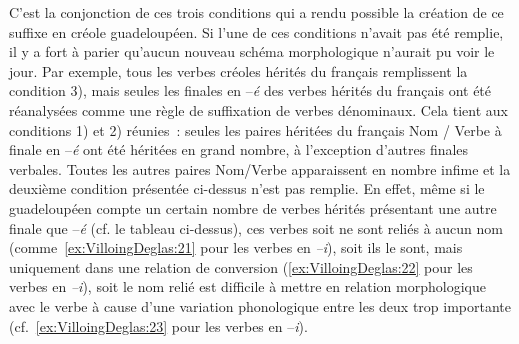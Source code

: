 \documentclass[output=paper]{langsci/langscibook}
\begin{document}
C'est la conjonction de ces trois conditions qui a rendu possible la
création de ce suffixe en créole guadeloupéen. Si l'une de ces
conditions n'avait pas été remplie, il y a fort à parier qu'aucun
nouveau schéma morphologique n'aurait pu voir le jour. Par exemple, tous
les verbes créoles hérités du français remplissent la condition 3), mais
seules les finales en --\emph{é} des verbes hérités du français ont été
réanalysées comme une règle de suffixation de verbes dénominaux. Cela
tient aux conditions 1) et 2) réunies~: seules les paires héritées du
français Nom / Verbe à finale en --\emph{é} ont été héritées en grand nombre, à
l'exception d'autres finales verbales. Toutes les autres paires
Nom/Verbe apparaissent en nombre infime et la deuxième condition
présentée ci-dessus n'est pas remplie. En effet, même si le guadeloupéen
compte un certain nombre de verbes hérités présentant une autre finale
que --\emph{é} (cf. le tableau ci-dessus), ces verbes soit ne sont
reliés à aucun nom (comme~\ref{ex:VilloingDeglas:21} pour les verbes en \emph{--i}), soit ils le
sont, mais uniquement dans une relation de conversion (\ref{ex:VilloingDeglas:22} pour les
verbes en \emph{--i}), soit le nom relié est difficile à mettre en
relation morphologique avec le verbe à cause d'une variation
phonologique entre les deux trop importante (cf.~\ref{ex:VilloingDeglas:23} pour les verbes en
--\emph{i}).
\end{document}
